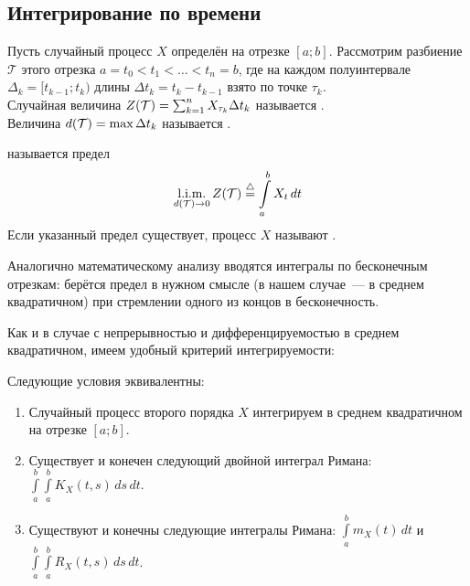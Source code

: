 \subsection{Интегрирование по времени} \label{subsection:calculus:time_integration}

\begin{definition}
    \label{definition:calculus:integral_sum}
    Пусть случайный процесс $ X $ определён на отрезке $ [a; b] $.
    Рассмотрим разбиение $ \mathcal{T} $ этого отрезка $ a = t_0 < t_1 < \ldots < t_n = b $,
    где на каждом полуинтервале $ \Delta_k = [t_{k-1}; t_k) $ длины $ \Delta t_k = t_k - t_{k-1} $ взято по точке $ \tau_k $.
    \\[0.25\baselineskip]
    Случайная величина $ Z(\mathcal{T}) = \sum_{k=1}^n X_{\tau_k} \Delta t_k $ называется
    .
    \\[0.25\baselineskip]
    Величина $ d(\mathcal{T}) = \max \Delta t_k $ называется .
\end{definition}

\begin{definition}
    \label{definition:calculus:integral}
     называется предел
    \[
        \operatorname*{\textnormal{l.i.m.}}_{d(\mathcal{T}) \to 0} Z(\mathcal{T}) \overset{\triangle}{=} \int\limits_a^b X_t \, dt
    \]
    Если указанный предел существует, процесс $ X $ называют .
\end{definition}

Аналогично математическому анализу вводятся интегралы по бесконечным отрезкам:
берётся предел в нужном смысле (в нашем случае~--- в среднем квадратичном) при стремлении одного из концов в бесконечность.

Как и в случае с непрерывностью и дифференцируемостью в среднем квадратичном,
имеем удобный критерий интегрируемости:

\begin{theorem}
    \label{theorem:calculus:mean_squares_integrability_test}
    Следующие условия эквивалентны:
    \begin{enumerate}
        \item
            Случайный процесс второго порядка $ X $ интегрируем в среднем квадратичном на отрезке $ [a; b] $.
        \item
            Существует и конечен следующий двойной интеграл Римана:
            $ \displaystyle \int\limits_a^b \int\limits_a^b K_X(t, s) \, ds \, dt $.
        \item
            Существуют и конечны следующие интегралы Римана:
            $ \displaystyle \int\limits_a^b m_X(t) \, dt $ и $ \displaystyle \int\limits_a^b \int\limits_a^b R_X(t, s) \, ds \, dt $.
    \end{enumerate}
\end{theorem}

